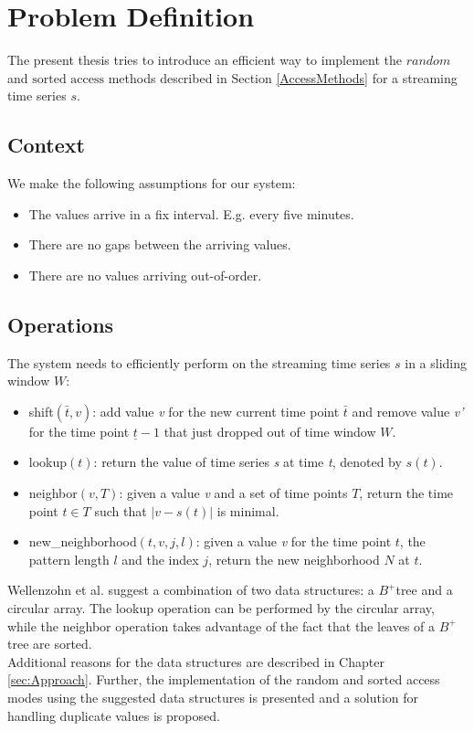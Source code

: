 \documentclass[abstracton,12pt]{scrreprt}
\begin{document}
\chapter{Problem Definition}
The present thesis tries to introduce an efficient way to implement the $random$ and $\text{sorted access}$ methods described in Section \ref{AccessMethods} for a streaming time series $s$.

\section{Context}
We make the following assumptions for our system: 
\begin{itemize}  
	\item The values arrive in a fix interval. E.g. every five minutes. 
	\item There are no gaps between the arriving values. 
	\item There are no values arriving out-of-order. 
\end{itemize}


\section{Operations}
\label{sec:Op}
The system needs to efficiently perform on the streaming time series $s$ in a sliding window $W$: 
\begin{itemize}  
	\item shift$(\bar{t}, v)$: add value \emph{v} for the new current time point $\bar{t}$ and remove value \emph{v'} for the time point $\underline{t} - 1$ that just dropped out of time window $W$.
	\item lookup$(t)$: return the value of time series \emph{s} at time \emph{t}, denoted by $s(t)$.
	\item neighbor$(v, T)$: given a value \emph{v} and a set of time points $T$, return the time point $t \in T$ such that $|v-s(t)|$ is minimal.
	\item new\_neighborhood$(t,v,j,l)$: given a value \emph{v} for the time point $t$, the pattern length $l$ and the index $j$, return the new neighborhood $N$ at $t$.
\end{itemize}
Wellenzohn et al.\cite{BScT} suggest a combination of two data structures: a $B^+$tree and a circular array. The lookup operation can be performed by the circular array, while the neighbor operation takes advantage of the fact that the leaves of a $B^+$tree are sorted. \\Additional reasons for the data structures are described in Chapter \ref{sec:Approach}. Further, the implementation of the random and sorted access modes using the suggested data structures is presented and a solution for  handling duplicate values is proposed. 
\end{document}
